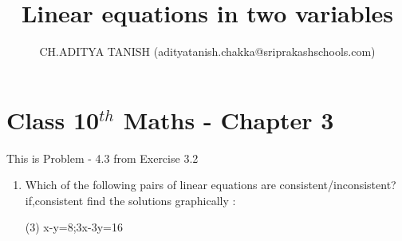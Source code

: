 \documentclass[12pt]{article}
\title{ Linear equations in two variables}
\author{CH.ADITYA TANISH (adityatanish.chakka@sriprakashschools.com)}
\begin{document}
\maketitle
\section*{Class 10$^{th}$ Maths - Chapter 3}
This is Problem - 4.3 from Exercise 3.2
\begin{enumerate}
\item Which of the following pairs of linear equations are consistent/inconsistent?if,consistent find the solutions graphically :
       
(3) x-y=8;3x-3y=16 \\

\end{enumerate}
\end{document}
